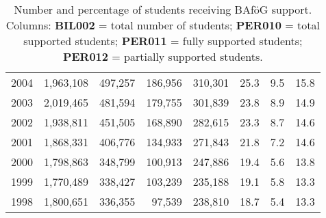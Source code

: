 \begin{landscape}
\begin{table}
\begin{tabular}{rrrrrrrr}
2004 & 1,963,108 & 497,257 & 186,956 & 310,301 & 25.3 & 9.5 & 15.8 \\
2003 & 2,019,465 & 481,594 & 179,755 & 301,839 & 23.8 & 8.9 & 14.9 \\
2002 & 1,938,811 & 451,505 & 168,890 & 282,615 & 23.3 & 8.7 & 14.6 \\
2001 & 1,868,331 & 406,776 & 134,933 & 271,843 & 21.8 & 7.2 & 14.6 \\
2000 & 1,798,863 & 348,799 & 100,913 & 247,886 & 19.4 & 5.6 & 13.8 \\
1999 & 1,770,489 & 338,427 & 103,239 & 235,188 & 19.1 & 5.8 & 13.3 \\
1998 & 1,800,651 & 336,355 & 97,539 & 238,810 & 18.7 & 5.4 & 13.3 \\
\bottomrule
\end{tabular}
\caption{
  Number and percentage of students receiving BAföG support.  
  Columns:  
  \textbf{BIL002} = total number of students;  
  \textbf{PER010} = total supported students;  
  \textbf{PER011} = fully supported students;  
  \textbf{PER012} = partially supported students.
}
\label{table:bafoeg_support_landscape}
\end{table}
\end{landscape}





